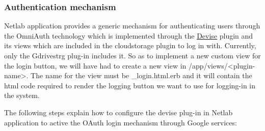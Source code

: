 \documentclass{article}
\begin{document}
\subsubsection{Authentication mechanism}
Netlab application provides a generic mechanism for authenticating users through the OmniAuth technology which is implemented through the \href{https://github.com/plataformatec/devise}{Devise} plugin and its views which are included in the cloudstorage plugin to log in with. Currently, only the Gdrivestrg plug-in includes it. So as to implement a new custom view for the login button, we will have had to create a new view in /app/views/\textless plugin-name\textgreater. The name for the view must be \_login.html.erb and it will contain the html code required to render the logging button we want to use for logging-in in the system.

The following steps explain how to configure the devise plug-in in Netlab application to active the OAuth login mechanism through Google services:
\end{document}
